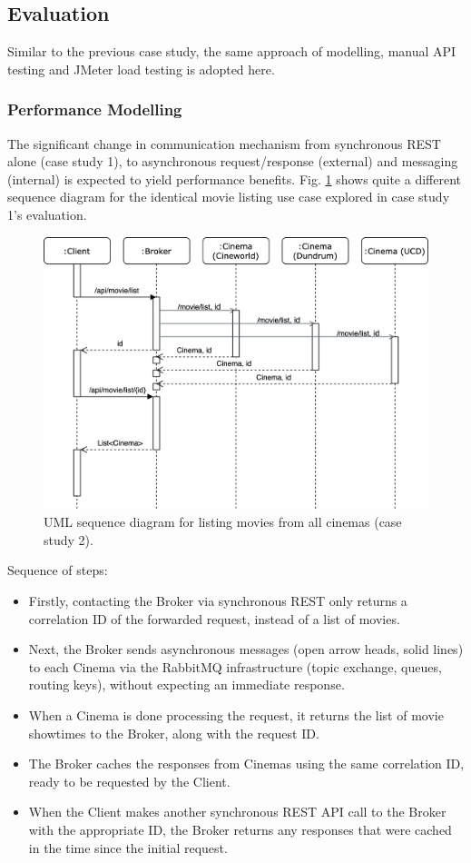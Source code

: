 \subsection{Evaluation}

Similar to the previous case study, the same approach of modelling, manual API testing and JMeter load testing is adopted here.

\subsubsection{Performance Modelling}

The significant change in communication mechanism from synchronous REST alone (case study 1), to asynchronous request/response (external) and messaging (internal) is expected to yield performance benefits. Fig. \ref{fig:cs02-sequence} shows quite a different sequence diagram for the identical movie listing use case explored in case study 1's evaluation.

\begin{figure}[H]
  \centering
  \includegraphics[width=0.75\linewidth]{./assets/diagrams/cs02-sequence.png}
  \caption{UML sequence diagram for listing movies from all cinemas (case study 2).}
  \label{fig:cs02-sequence}
\end{figure}

Sequence of steps:
\begin{itemize}
  \item Firstly, contacting the Broker via synchronous REST only returns a correlation ID of the forwarded request, instead of a list of movies.
  \item Next, the Broker sends asynchronous messages (open arrow heads, solid lines) to each Cinema via the RabbitMQ infrastructure (topic exchange, queues, routing keys), without expecting an immediate response.
  \item When a Cinema is done processing the request, it returns the list of movie showtimes to the Broker, along with the request ID.
  \item The Broker caches the responses from Cinemas using the same correlation ID, ready to be requested by the Client.
  \item When the Client makes another synchronous REST API call to the Broker with the appropriate ID, the Broker returns any responses that were cached in the time since the initial request.
\end{itemize}

